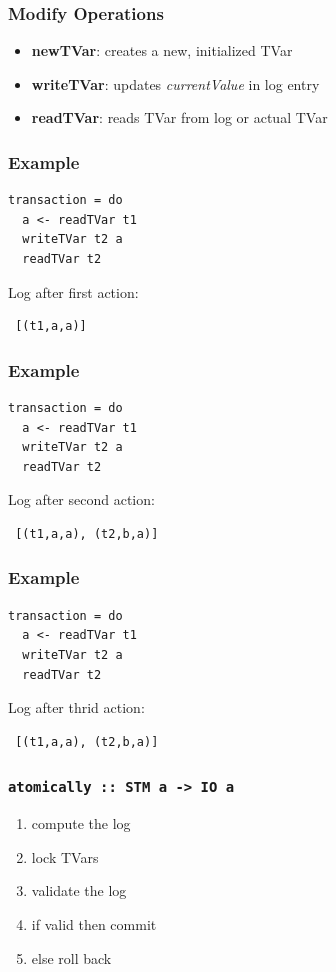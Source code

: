 \documentclass{beamer}
\begin{document}
  \begin{frame}
   \frametitle{Modify Operations}
   \begin{itemize}\setlength\itemsep{1em}
    \item \textbf{newTVar}: creates a new, initialized TVar 
    \item \textbf{writeTVar}: updates \textit{currentValue} in log entry
    \item \textbf{readTVar}: reads TVar from log or actual TVar
  \end{itemize}
\end{frame}
  
\begin{frame}[fragile]
\frametitle{Example}
\begin{lstlisting} 
transaction = do
  a <- readTVar t1
  writeTVar t2 a
  readTVar t2
\end{lstlisting}
\vfill
\pause
Log after first action:
\begin{lstlisting}
 [(t1,a,a)]
\end{lstlisting}
\end{frame}
  
\begin{frame}[fragile]
\frametitle{Example}
\begin{lstlisting} 
transaction = do
  a <- readTVar t1
  writeTVar t2 a
  readTVar t2
\end{lstlisting}
\vfill
Log after second action:
\begin{lstlisting}
 [(t1,a,a), (t2,b,a)]
\end{lstlisting}
\end{frame}


\begin{frame}[fragile]
\frametitle{Example}
\begin{lstlisting} 
transaction = do
  a <- readTVar t1
  writeTVar t2 a
  readTVar t2
\end{lstlisting}
\vfill
Log after thrid action:
\begin{lstlisting}
 [(t1,a,a), (t2,b,a)]
\end{lstlisting}
\end{frame}
     
  \begin{frame}
   \frametitle{\lstinline{atomically :: STM a -> IO a}}
   \begin{enumerate}\setlength\itemsep{1em}
    \item compute the log
    \item lock TVars
    \item validate the log
    \item if valid then commit
    \item else roll back
   \end{enumerate}
  \end{frame}
\end{document}
